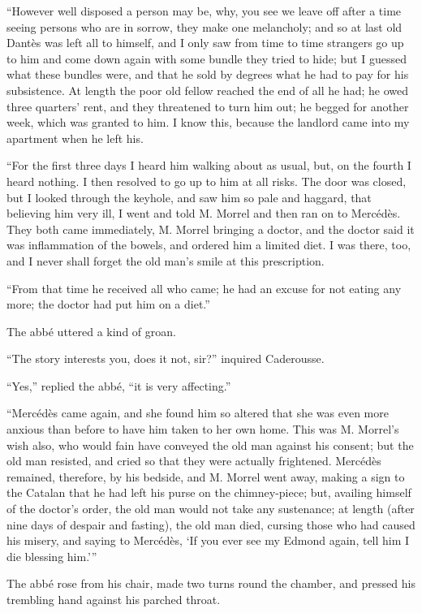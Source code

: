 “However well disposed a person may be, why, you see we leave off after
a time seeing persons who are in sorrow, they make one melancholy; and
so at last old Dantès was left all to himself, and I only saw from time
to time strangers go up to him and come down again with some bundle
they tried to hide; but I guessed what these bundles were, and that he
sold by degrees what he had to pay for his subsistence. At length the
poor old fellow reached the end of all he had; he owed three quarters’
rent, and they threatened to turn him out; he begged for another week,
which was granted to him. I know this, because the landlord came into
my apartment when he left his.

“For the first three days I heard him walking about as usual, but, on
the fourth I heard nothing. I then resolved to go up to him at all
risks. The door was closed, but I looked through the keyhole, and saw
him so pale and haggard, that believing him very ill, I went and told
M. Morrel and then ran on to Mercédès. They both came immediately, M.
Morrel bringing a doctor, and the doctor said it was inflammation of
the bowels, and ordered him a limited diet. I was there, too, and I
never shall forget the old man’s smile at this prescription.

“From that time he received all who came; he had an excuse for not
eating any more; the doctor had put him on a diet.”

The abbé uttered a kind of groan.

“The story interests you, does it not, sir?” inquired Caderousse.

“Yes,” replied the abbé, “it is very affecting.”

“Mercédès came again, and she found him so altered that she was even
more anxious than before to have him taken to her own home. This was M.
Morrel’s wish also, who would fain have conveyed the old man against
his consent; but the old man resisted, and cried so that they were
actually frightened. Mercédès remained, therefore, by his bedside, and
M. Morrel went away, making a sign to the Catalan that he had left his
purse on the chimney-piece; but, availing himself of the doctor’s
order, the old man would not take any sustenance; at length (after nine
days of despair and fasting), the old man died, cursing those who had
caused his misery, and saying to Mercédès, ‘If you ever see my Edmond
again, tell him I die blessing him.’”

The abbé rose from his chair, made two turns round the chamber, and
pressed his trembling hand against his parched throat.

